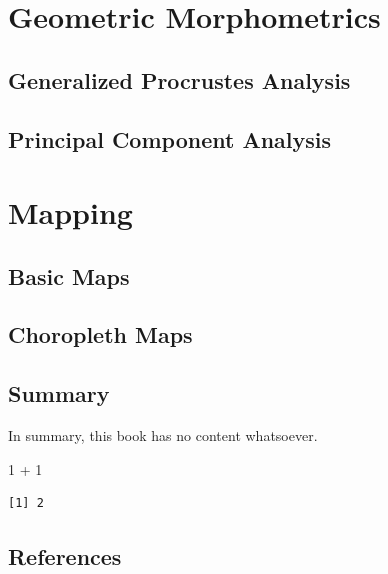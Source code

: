 \documentclass[
  letterpaper,
  DIV=11,
  numbers=noendperiod]{scrreprt}
\newenvironment{Shaded}{\begin{snugshade}}{\end{snugshade}}
\newcommand{\DecValTok}[1]{\textcolor[rgb]{0.68,0.00,0.00}{#1}}
\newcommand{\SpecialCharTok}[1]{\textcolor[rgb]{0.37,0.37,0.37}{#1}}
\begin{document}
\part{Geometric Morphometrics}

\chapter{Generalized Procrustes
Analysis}\label{generalized-procrustes-analysis}

\chapter{Principal Component
Analysis}\label{principal-component-analysis}

\part{Mapping}

\chapter{Basic Maps}\label{basic-maps}

\chapter{Choropleth Maps}\label{choropleth-maps}


\chapter{Summary}\label{summary}

In summary, this book has no content whatsoever.

\begin{Shaded}
\begin{Highlighting}[]
\DecValTok{1} \SpecialCharTok{+} \DecValTok{1}
\end{Highlighting}
\end{Shaded}

\begin{verbatim}
[1] 2
\end{verbatim}


\chapter*{References}\label{references}


\protect{}\label{refs}
\end{document}
